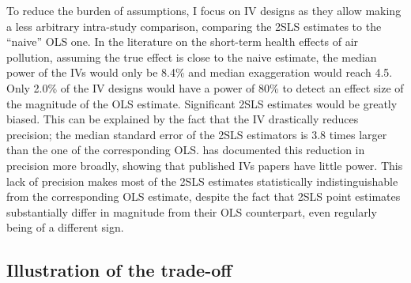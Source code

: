 \documentclass[usletter, 12pt]{article}
\begin{document}
			To reduce the burden of assumptions, I focus on IV designs as they allow making a less arbitrary intra-study comparison, comparing the 2SLS estimates to the ``naive'' OLS one. In the literature on the short-term health effects of air pollution, assuming the true effect is close to the naive estimate, the median power of the IVs would only be 8.4\% and median exaggeration would reach 4.5. Only 2.0\% of the IV designs would have a power of 80\% to detect an effect size of the magnitude of the OLS estimate. Significant 2SLS estimates would be greatly biased. This can be explained by the fact that the IV drastically reduces precision; the median standard error of the 2SLS estimators is 3.8 times larger than the one of the corresponding OLS. %
			\cite{youngConsistencyInferenceInstrumental2022} has documented this reduction in precision more broadly, showing that published IVs papers have little power. This lack of precision makes most of the 2SLS estimates statistically indistinguishable from the corresponding OLS estimate, despite the fact that 2SLS point estimates substantially differ in magnitude from their OLS counterpart, even regularly being of a different sign.
			 
	\subsection{Illustration of the trade-off}
	
\end{document}
